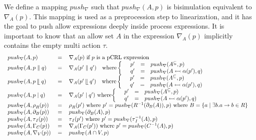 \documentclass{article}
\begin{document}
We define a mapping $push_{\nabla }$ such that $push_{\nabla }(A,p)$ is
bisimulation equivalent to $\nabla _{A}(p)$. This mapping is used as a
preprocession step to linearization, and it has the goal to push allow
expressions deeply inside process expressions. It is important to know that
an allow set $A$ in the expression $\nabla _{A}(p)$ implicitly contains the
empty multi action $\tau $.%
\[
\begin{tabular}{lll}
$push_{\nabla }(A,p)$ & $=$ & $\nabla _{A}(p)$ if $p$ is a pCRL expression
\\ 
$push_{\nabla }(A,p\parallel q)$ & $=$ & $\nabla _{A}(p^{\prime }\parallel
q^{\prime })\text{ where}\left\{ \text{ }%
\begin{array}{lll}
p^{\prime } & = & push_{\nabla }(A^{\subseteq },p) \\ 
q^{\prime } & = & push_{\nabla }(A\leftarrowtail \alpha (p^{\prime }),q)%
\end{array}%
\right. $ \\ 
$push_{\nabla }(A,p\mathbin{\mathrel{\llfloor}}q)$ & $=$ & $\nabla
_{A}(p^{\prime }\mathbin{\mathrel{\llfloor}}q^{\prime })\text{ where}\left\{ 
\text{ }%
\begin{array}{lll}
p^{\prime } & = & push_{\nabla }(A^{\subseteq },p) \\ 
q^{\prime } & = & push_{\nabla }(A\leftarrowtail \alpha (p^{\prime }),q)%
\end{array}%
\right. $ \\ 
$push_{\nabla }(A,p\mid q)$ & $=$ & $\nabla _{A}(p^{\prime }\mid q^{\prime
}) $ where$\left\{ \text{ }%
\begin{array}{lll}
p^{\prime } & = & push_{\nabla }(A^{\subseteq },p) \\ 
q^{\prime } & = & push_{\nabla }(A\leftarrowtail \alpha (p^{\prime }),q)%
\end{array}%
\right. $ \\ 
$push_{\nabla }(A,\rho _{R}(p))$ & $=$ & $\rho _{R}(p^{\prime })$ where $%
p^{\prime }=$ $push_{\nabla }(R^{-1}(\partial _{B}(A)),p)$ where $B=\{a\mid
\exists b.a\rightarrow b\in R\}$ \\ 
$push_{\nabla }(A,\partial _{B}(p))$ & $=$ & $push_{\nabla }(\partial
_{B}(A),p)$ \\ 
$push_{\nabla }(A,\tau _{I}(p))$ & $=$ & $\tau _{I}(p^{\prime })$ where $%
p^{\prime }=push_{\nabla }(\tau _{I}^{-1}(A),p)$ \\ 
$push_{\nabla }(A,\Gamma _{C}(p))$ & $=$ & $\nabla _{A}(\Gamma
_{C}(p^{\prime }))$ where $p^{\prime }=push_{\nabla }(C^{-1}(A),p)$ \\ 
$push_{\nabla }(A,\nabla _{V}(p))$ & $=$ & $push_{\nabla }(A\cap V,p)$%
\end{tabular}%
\]
\end{document}
